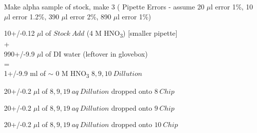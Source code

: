 \documentclass[idxtotoc,hyperref,openany,oneside]{labbook} %
\newcommand{\cmark}{\ding{51}}%
\newcommand{\done}{\rlap{$\square$}{\raisebox{2pt}{\large\hspace{1pt}\cmark}}%
  \hspace{-2.5pt}}
\newcommand{\tsbs}{\textsubscript}
\begin{document}

\begin{todolist}
  
\item[\done]{Make alpha sample of stock, make 3 (
      Pipette Errors - assume 20 $\mu$l error 1\%,
      10 $\mu$l error 1.2\%, 390 $\mu$l error 2\%, 890 $\mu$l error 1\%)}
\end{todolist}
\begin{center}
  10+/-0.12 $\mu$l of $\boxed{Stock\ Add}$ (4 M HNO\tsbs{3})
  [smaller pipette]\\
+\\
990+/-9.9 $\mu$l of DI water (leftover in glovebox)\\
=\\
1+/-9.9 ml of $\sim$ 0 M HNO\tsbs{3} $\boxed{8,9,10\ Dillution}$
\end{center}
\vspace{0.3cm}
\begin{center}
  20+/-0.2 $\mu$l of $\boxed{8,9,19\ aq\ Dillution}$ dropped onto
  $\boxed{8\ Chip}$
\end{center}
\begin{center}
  20+/-0.2 $\mu$l of $\boxed{8,9,19\ aq\ Dillution}$ dropped onto
  $\boxed{9\ Chip}$
\end{center}
\begin{center}
  20+/-0.2 $\mu$l of $\boxed{8,9,19\ aq\ Dillution}$ dropped onto
  $\boxed{10\ Chip}$
\end{center}
\end{document}
